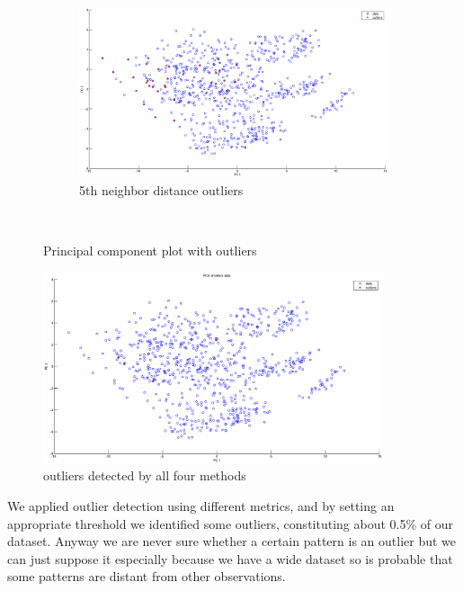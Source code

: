 \begin{figure}[htbp]
                \quad
	\begin{subfigure}[b]{0.55\textwidth}
                \includegraphics[width=10cm]{figures/pc4.eps}
                \caption{5th neighbor distance outliers}
         \end{subfigure} \\
        \caption{Principal component plot with outliers}
        \label{fig:r2}
\end{figure}

\begin{figure}[htbp]
        \center
                \includegraphics[width=10cm]{figures/pc5.eps}
                \caption{outliers detected by all four methods}
        \label{fig:r3}
\end{figure}


We applied outlier detection using different metrics, and by setting an appropriate threshold we identified some outliers, constituting about 0.5\% of our dataset. Anyway we are never sure whether a certain pattern is an outlier but we can just suppose it especially because we have a wide dataset so is probable that some patterns are distant from other observations.
